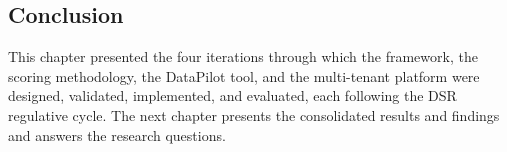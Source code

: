 \subsection{Conclusion}

This chapter presented the four iterations through which the framework, the scoring methodology, the DataPilot tool, and the multi-tenant platform were designed, validated, implemented, and evaluated, each following the DSR regulative cycle. The next chapter presents the consolidated results and findings and answers the research questions.
